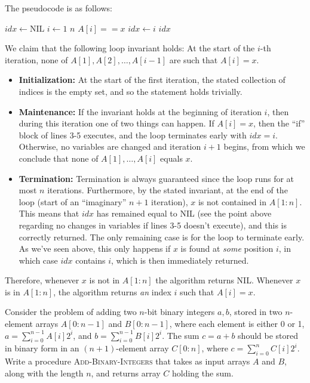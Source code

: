 \begin{solution}
    
    The pseudocode is as follows:

    \begin{codebox}
        \li $idx \gets \mathrm{NIL}$
        \li \For $i \gets 1$ \To $n$
        \li \Do \If $A[i] == x$
        \li \Do $idx \gets i$
        \li {}
        \End
        \End
        \li \Return $idx$
    \end{codebox}

    We claim that the following loop invariant holds: At the start of the $i$-th iteration, none of $A[1], A[2], \ldots, A[i - 1]$ are such that $A[i] = x$.
    \begin{itemize}
        \item \textbf{Initialization:} At the start of the first iteration, the stated collection of indices is the empty set, and so the statement holds trivially.
        \item \textbf{Maintenance:} If the invariant holds at the beginning of iteration $i$, then during this iteration one of two things can happen.
        If $A[i] = x$, then the ``if'' block of lines 3-5 executes, and the loop terminates early with $idx = i$.
        Otherwise, no variables are changed and iteration $i + 1$ begins, from which we conclude that none of $A[1], \ldots, A[i]$ equals $x$.
        \item \textbf{Termination:} Termination is always guaranteed since the loop runs for at most $n$ iterations.
        Furthermore, by the stated invariant, at the end of the loop (start of an ``imaginary'' $n + 1$ iteration), $x$ is not contained in $A[1:n]$.
        This means that $idx$ has remained equal to NIL (see the point above regarding no changes in variables if  lines 3-5 doesn't execute), and this is correctly returned.
        The only remaining case is for the loop to terminate early.
        As we've seen above, this only happens if $x$ is found at \textit{some} position $i$, in which case $idx$ contains $i$, which is then immediately returned.
    \end{itemize}
    Therefore, whenever $x$ is not in $A[1:n]$ the algorithm returns NIL.
    Whenever $x$ is in $A[1:n]$, the algorithm returns \textit{an} index $i$ such that $A[i] = x$.
\end{solution}

\newpage

\begin{exercise}{5}
    Consider the problem of adding two $n$-bit binary integers $a, b$, stored in two $n$-element arrays $A[0:n-1]$ and $B[0:n-1]$, where each element is either 0 or 1, $a = \sum_{i=0}^{n-1} A[i]2^i$, and $b = \sum_{i=0}^{n-1} B[i]2^i$.
    The sum $c = a + b$ should be stored in binary form in an $(n + 1)$-element array $C[0:n]$, where $c = \sum_{i=0}^{n} C[i]2^i$.
    Write a procedure A\textsc{dd-}B\textsc{inary-}I\textsc{ntegers} that takes as input arrays $A$ and $B$, along with the length $n$, and returns array $C$ holding the sum.
\end{exercise}

